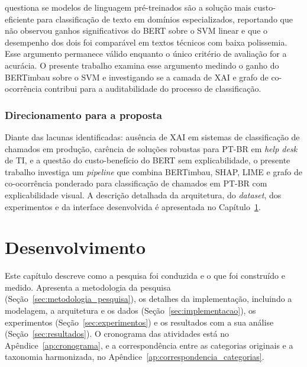 \documentclass[
    12pt,                %
    openright,           %
    oneside,             %
    a4paper,             %
    english,             %
    brazil               %
]{abntex2}
\begin{document}
 questiona se modelos de linguagem
pré-treinados são a solução mais custo-eficiente para
classificação de texto em domínios especializados,
reportando que não observou ganhos significativos do BERT
sobre o SVM linear e que o desempenho dos dois foi
comparável em textos técnicos com baixa polissemia. Esse argumento permanece válido enquanto o único critério 
de avaliação for a acurácia. O presente trabalho examina esse argumento medindo o ganho do BERTimbau sobre o SVM e investigando se a camada de XAI e grafo de co-ocorrência contribui para a auditabilidade do processo de classificação.

\subsection{Direcionamento para a proposta}
\label{subsec:sintese_direcao}

Diante das lacunas identificadas: ausência de XAI em sistemas de classificação de chamados em produção, carência de soluções robustas para PT-BR em \textit{help desk} de TI, e a questão do custo-benefício do BERT sem explicabilidade, o presente trabalho investiga um \textit{pipeline} que combina BERTimbau, SHAP, LIME e grafo de co-ocorrência ponderado para classificação de chamados em PT-BR com explicabilidade visual. A descrição detalhada da arquitetura, do \textit{dataset}, dos experimentos e da interface desenvolvida é apresentada no Capítulo~\ref{cap:desenvolvimento}.

\chapter{Desenvolvimento}
\label{cap:desenvolvimento}

Este capítulo descreve como a pesquisa foi conduzida e o que foi construído e medido. Apresenta a metodologia da pesquisa (Seção~\ref{sec:metodologia_pesquisa}), os detalhes da implementação, incluindo a modelagem, a arquitetura e os dados (Seção~\ref{sec:implementacao}), os experimentos (Seção~\ref{sec:experimentos}) e os resultados com a sua análise (Seção~\ref{sec:resultados}). O cronograma das atividades está no Apêndice~\ref{ap:cronograma}, e a correspondência entre as categorias originais e a taxonomia harmonizada, no Apêndice~\ref{ap:correspondencia_categorias}.
\end{document}
